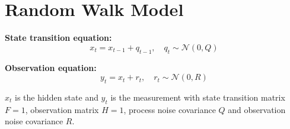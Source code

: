 





\section*{Random Walk Model}

\noindent   
\textbf{State transition equation:}
\[x_t= x_{t-1} + q_{t-1}, \quad q_t \sim \mathcal{N}(0,Q)\]

\medskip
\noindent   
\textbf{Observation equation:}
$$y_t = x_t+ r_t, \quad r_t \sim \mathcal{N}(0,R)$$ 

$x_t$ is the hidden state and $y_t$ is the measurement with state transition matrix $F=1$, observation matrix $H=1$, process noise covariance $Q$ and observation noise covariance $R$.

